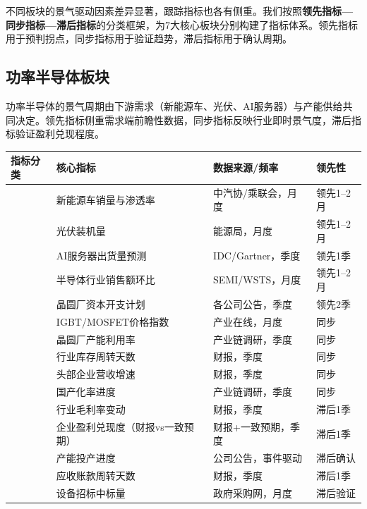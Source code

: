不同板块的景气驱动因素差异显著，跟踪指标也各有侧重。我们按照\textbf{领先指标—同步指标—滞后指标}的分类框架，为7大核心板块分别构建了指标体系。领先指标用于预判拐点，同步指标用于验证趋势，滞后指标用于确认周期。

\subsection{功率半导体板块}

功率半导体的景气周期由下游需求（新能源车、光伏、AI服务器）与产能供给共同决定。领先指标侧重需求端前瞻性数据，同步指标反映行业即时景气度，滞后指标验证盈利兑现程度。

\begin{exhibitbox}[表9-4：功率半导体板块核心跟踪指标]
\scriptsize
\setlength{\tabcolsep}{3pt}
\renewcommand{\arraystretch}{1.12}
\begin{tabularx}{\textwidth}{l X l l}
\toprule
\textbf{指标分类} & \textbf{核心指标} & \textbf{数据来源/频率} & \textbf{领先性} \\
\midrule
\rowcolor{navy!6}
& 新能源车销量与渗透率 & 中汽协/乘联会，月度 & 领先1--2月 \\
\rowcolor{navy!6}
& 光伏装机量 & 能源局，月度 & 领先1--2月 \\
\rowcolor{navy!6}
& AI服务器出货量预测 & IDC/Gartner，季度 & 领先1季 \\
\rowcolor{navy!6}
& 半导体行业销售额环比 & SEMI/WSTS，月度 & 领先1--2月 \\
\rowcolor{navy!6}
\multirow{-5}{*}{\textbf{领先指标}} & 晶圆厂资本开支计划 & 各公司公告，季度 & 领先2季 \\
\midrule
\rowcolor{accentblue!6}
& IGBT/MOSFET价格指数 & 产业在线，月度 & 同步 \\
\rowcolor{accentblue!6}
& 晶圆厂产能利用率 & 产业链调研，季度 & 同步 \\
\rowcolor{accentblue!6}
& 行业库存周转天数 & 财报，季度 & 同步 \\
\rowcolor{accentblue!6}
& 头部企业营收增速 & 财报，季度 & 同步 \\
\rowcolor{accentblue!6}
\multirow{-5}{*}{\textbf{同步指标}} & 国产化率进度 & 产业链调研，季度 & 同步 \\
\midrule
\rowcolor{riskgreen!6}
& 行业毛利率变动 & 财报，季度 & 滞后1季 \\
\rowcolor{riskgreen!6}
& 企业盈利兑现度（财报vs一致预期） & 财报+一致预期，季度 & 滞后1季 \\
\rowcolor{riskgreen!6}
& 产能投产进度 & 公司公告，事件驱动 & 滞后确认 \\
\rowcolor{riskgreen!6}
& 应收账款周转天数 & 财报，季度 & 滞后1季 \\
\rowcolor{riskgreen!6}
\multirow{-5}{*}{\textbf{滞后指标}} & 设备招标中标量 & 政府采购网，月度 & 滞后验证 \\
\bottomrule
\end{tabularx}
\end{exhibitbox}

